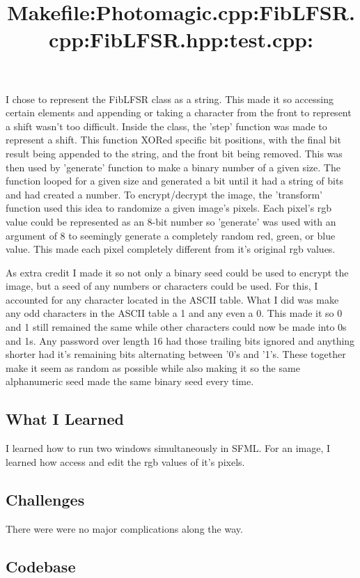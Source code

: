 I chose to represent the FibLFSR class as a string. 
This made it so accessing certain elements and appending or taking a character from the front to represent a shift wasn't too difficult.
Inside the class, the 'step' function was made to represent a shift.
This function XORed specific bit positions, with the final bit result being appended to the string, and the front bit being removed.
This was then used by 'generate' function to make a binary number of a given size.
The function looped for a given size and generated a bit until it had a string of bits and had created a number.
To encrypt/decrypt the image, the 'transform' function used this idea to randomize a given image's pixels.
Each pixel's rgb value could be represented as an 8-bit number so 'generate' was used with an argument of 8 to seemingly generate a completely random red, green, or blue value.
This made each pixel completely different from it's original rgb values.
\bigskip

As extra credit I made it so not only a binary seed could be used to encrypt the image, but a seed of any numbers or characters could be used.
For this, I accounted for any character located in the ASCII table.
What I did was make any odd characters in the ASCII table a 1 and any even a 0.
This made it so 0 and 1 still remained the same while other characters could now be made into 0s and 1s.
Any password over length 16 had those trailing bits ignored and anything shorter had it's remaining bits alternating between '0's and '1's.
These together make it seem as random as possible while also making it so the same alphanumeric seed made the same binary seed every time.

\subsection{What I Learned}\label{sec:ps1:learned} %

I learned how to run two windows simultaneously in SFML.
For an image, I learned how access and edit the rgb values of it's pixels.

\subsection{Challenges}\label{sec:ps1:challenges} %

There were were no major complications along the way.

\newpage
\subsection{Codebase}\label{sec:ps1:code} %

\bigskip
\title{\large Makefile:}

\bigskip
\title{\large Photomagic.cpp:}

\bigskip
\title{\large FibLFSR.cpp:}

\bigskip
\title{\large FibLFSR.hpp:}

\bigskip
\title{\large test.cpp:}


\newpage


